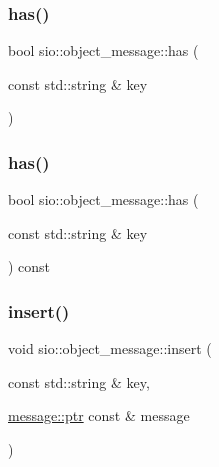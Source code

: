 \subsubsection{\texorpdfstring{has()}{has()}\hspace{0.1cm}{\footnotesize\ttfamily [1/2]}}
{\footnotesize\ttfamily bool sio\+::object\+\_\+message\+::has (\begin{DoxyParamCaption}\item[{const std\+::string \&}]{key }\end{DoxyParamCaption})\hspace{0.3cm}{\ttfamily [inline]}}

\mbox{\label{classsio_1_1object__message_a7b34b62fbd7d8f681509e28b3695d235}} 
\subsubsection{\texorpdfstring{has()}{has()}\hspace{0.1cm}{\footnotesize\ttfamily [2/2]}}
{\footnotesize\ttfamily bool sio\+::object\+\_\+message\+::has (\begin{DoxyParamCaption}\item[{const std\+::string \&}]{key }\end{DoxyParamCaption}) const\hspace{0.3cm}{\ttfamily [inline]}}

\mbox{\label{classsio_1_1object__message_a1d12ae0a5f6820f54d47e8c84f2f2316}} 
\subsubsection{\texorpdfstring{insert()}{insert()}\hspace{0.1cm}{\footnotesize\ttfamily [1/5]}}
{\footnotesize\ttfamily void sio\+::object\+\_\+message\+::insert (\begin{DoxyParamCaption}\item[{const std\+::string \&}]{key,  }\item[{\hyperlink{classsio_1_1message_a6340b6fef57e4516eb17928b1885a615}{message\+::ptr} const \&}]{message }\end{DoxyParamCaption})\hspace{0.3cm}{\ttfamily [inline]}}


